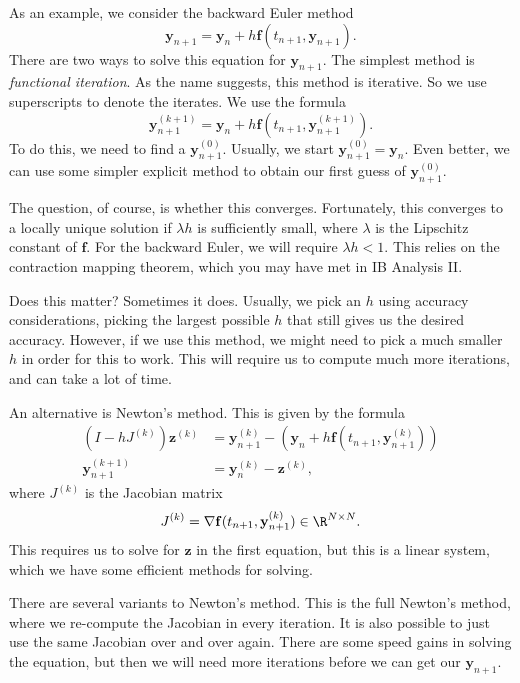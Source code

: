 \documentclass[a4paper]{article}
\begin{document}
As an example, we consider the backward Euler method
\[
  \mathbf{y}_{n + 1} = \mathbf{y}_n + h \mathbf{f}(t_{n + 1}, \mathbf{y}_{n + 1}).
\]
There are two ways to solve this equation for $\mathbf{y}_{n + 1}$. The simplest method is \emph{functional iteration}. As the name suggests, this method is iterative. So we use superscripts to denote the iterates. We use the formula
\[
  \mathbf{y}_{n + 1}^{(k + 1)} = \mathbf{y}_n + h \mathbf{f}(t_{n + 1}, \mathbf{y}_{n + 1}^{(k + 1)}).
\]
To do this, we need to find a $\mathbf{y}_{n + 1}^{(0)}$. Usually, we start $\mathbf{y}_{n + 1}^{(0)} = \mathbf{y}_n$. Even better, we can use some simpler explicit method to obtain our first guess of $\mathbf{y}_{n + 1}^{(0)}$.

The question, of course, is whether this converges. Fortunately, this converges to a locally unique solution if $\lambda h$ is sufficiently small, where $\lambda$ is the Lipschitz constant of $\mathbf{f}$. For the backward Euler, we will require $\lambda h < 1$. This relies on the contraction mapping theorem, which you may have met in IB Analysis II.

Does this matter? Sometimes it does. Usually, we pick an $h$ using accuracy considerations, picking the largest possible $h$ that still gives us the desired accuracy. However, if we use this method, we might need to pick a much smaller $h$ in order for this to work. This will require us to compute much more iterations, and can take a lot of time.

An alternative is Newton's method. This is given by the formula
\begin{align*}
  (I - hJ^{(k)}) \mathbf{z}^{(k)} &= \mathbf{y}_{n + 1}^{(k)} - (\mathbf{y}_n + h \mathbf{f}(t_{n + 1}, \mathbf{y}_{n + 1}^{(k)}))\\
  \mathbf{y}_{n + 1}^{(k + 1)} &= \mathbf{y}_n^{(k)} - \mathbf{z}^{(k)},
\end{align*}
where $J^{(k)}$ is the Jacobian matrix
\[
  J^{(k)} = \nabla \mathbf{f}(t_{n + 1}, \mathbf{y}_{n + 1}^{(k)}) \in \R^{N \times N}.
\]
This requires us to solve for $\mathbf{z}$ in the first equation, but this is a linear system, which we have some efficient methods for solving.

There are several variants to Newton's method. This is the full Newton's method, where we re-compute the Jacobian in every iteration. It is also possible to just use the same Jacobian over and over again. There are some speed gains in solving the equation, but then we will need more iterations before we can get our $\mathbf{y}_{n + 1}$.
\end{document}
